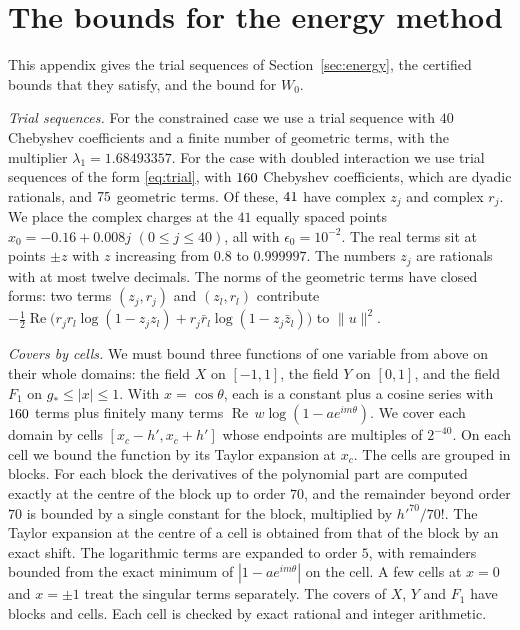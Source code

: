 \section{The bounds for the energy method}\label{app:field}

This appendix gives the trial sequences of Section~\ref{sec:energy}, the certified bounds that they satisfy, and
the bound for $W_0$.

\emph{Trial sequences.} For the constrained case we use a trial sequence with $40$ Chebyshev coefficients and a
finite number of geometric terms, with the multiplier $\lambda_1=1.68493357$. For the case with doubled
interaction we use trial sequences of the form \eqref{eq:trial}, with $160$ Chebyshev coefficients, which are
dyadic rationals, and $75$ geometric terms. Of these, $41$ have complex $z_j$ and complex $r_j$. We
place the complex charges at the $41$ equally spaced points $x_0=-0.16+0.008j$ $(0\le j\le40)$, all with
$\epsilon_0=10^{-2}$. The real terms sit at points $\pm z$ with $z$ increasing from $0.8$ to $0.999997$. The
numbers $z_j$ are rationals with at most twelve decimals. The norms of the geometric terms have closed forms:
two terms $(z_j,r_j)$ and $(z_l,r_l)$ contribute
$-\frac12\operatorname{Re}\bigl(r_jr_l\log(1-z_jz_l)+r_j\bar r_l\log(1-z_j\bar z_l)\bigr)$ to $\|u\|^2$.

\emph{Covers by cells.} We must bound three functions of one variable from above on their whole domains: the
field $X$ on $[-1,1]$, the field $Y$ on $[0,1]$, and the field $F_1$ on $g_*\le|x|\le1$. With $x=\cos\theta$,
each is a constant plus a cosine series with $160$ terms plus finitely many terms
$\operatorname{Re}\,w\log(1-ae^{im\theta})$. We cover each domain by cells $[x_c-h',x_c+h']$ whose endpoints are
multiples of $2^{-40}$. On each cell we bound the function by its Taylor expansion at $x_c$. The cells are
grouped in blocks. For each block the derivatives of the polynomial part are computed exactly at the centre
of the block up to order $70$, and the remainder beyond order $70$ is bounded by a single constant for the
block, multiplied by $h'^{70}/70!$. The Taylor expansion at the centre of a cell is obtained from that of the
block by an exact shift. The logarithmic terms are expanded to order $5$, with remainders bounded from the
exact minimum of $|1-ae^{im\theta}|$ on the cell. A few cells at $x=0$ and $x=\pm1$ treat the singular terms
separately. The covers of $X$, $Y$ and $F_1$ have \Nblocks{} blocks and \Ncells{} cells. Each cell is
checked by exact rational and integer arithmetic.

